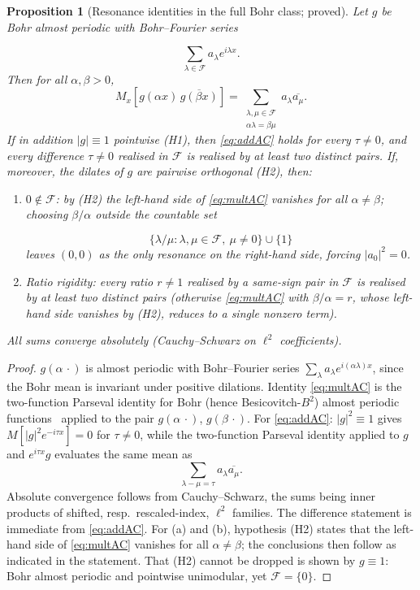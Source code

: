 \documentclass[11pt]{article}
\newtheorem{proposition}[theorem]{Proposition}
\begin{document}
\begin{proposition}[Resonance identities in the full Bohr class; proved]
\label{prop:resonance}
Let $g$ be Bohr almost periodic with Bohr--Fourier series

\[
\sum_{\lambda\in\mathcal{F}} a_\lambda e^{i\lambda x}.
\]
 Then for all
$\alpha,\beta>0$,
\begin{equation}\label{eq:multAC}
M_x\!\left[g(\alpha x)\,\overline{g(\beta x)}\right]
= \sum_{\substack{\lambda,\mu\in\mathcal{F}\\ \alpha\lambda=\beta\mu}}
a_\lambda\overline{a_\mu}.
\end{equation}
If in addition $|g|\equiv 1$ pointwise (H1), then \eqref{eq:addAC} holds
for every $\tau\neq 0$, and every difference $\tau\neq0$ realised in
$\mathcal{F}$ is realised by at least two distinct pairs. If, moreover, the
dilates of $g$ are pairwise orthogonal (H2), then:
\begin{enumerate}
\item[(a)] $0\notin\mathcal{F}$: by (H2) the left-hand side of
\eqref{eq:multAC} vanishes for all $\alpha\neq\beta$; choosing
$\beta/\alpha$ outside the countable set

\[
\{\lambda/\mu : \lambda,\mu\in\mathcal{F},\ \mu\neq0\}\cup\{1\}
\]
 leaves
$(0,0)$ as the only resonance on the right-hand side, forcing $|a_0|^2=0$.
\item[(b)] Ratio rigidity: every ratio $r\neq1$ realised by a same-sign
pair in $\mathcal{F}$ is realised by at least two distinct pairs (otherwise
\eqref{eq:multAC} with $\beta/\alpha=r$, whose left-hand side vanishes by
(H2), reduces to a single nonzero term).
\end{enumerate}
All sums converge absolutely (Cauchy--Schwarz on $\ell^2$ coefficients).
\end{proposition}

\begin{proof}
$g(\alpha\,\cdot)$ is almost periodic with Bohr--Fourier series
$\sum_\lambda a_\lambda e^{i(\alpha\lambda)x}$, since the Bohr mean is
invariant under positive dilations. Identity \eqref{eq:multAC} is the
two-function Parseval identity for Bohr (hence Besicovitch-$B^2$) almost
periodic functions~\cite{Besicovitch32,Corduneanu68} applied to the pair
$g(\alpha\,\cdot)$, $g(\beta\,\cdot)$. For \eqref{eq:addAC}: $|g|^2\equiv 1$
gives $M[|g|^2 e^{-i\tau x}] = 0$ for $\tau\neq0$, while the two-function
Parseval identity applied to $g$ and $e^{i\tau x}g$ evaluates the same
mean as 
\[
\sum_{\lambda-\mu=\tau} a_\lambda\overline{a_\mu}.
\]
 Absolute
convergence follows from Cauchy--Schwarz, the sums being inner products
of shifted, resp.\ rescaled-index, $\ell^2$ families. The difference
statement is immediate from \eqref{eq:addAC}. For (a) and (b),
hypothesis (H2) states that the left-hand side of \eqref{eq:multAC}
vanishes for all $\alpha\neq\beta$; the conclusions then follow as
indicated in the statement. That (H2) cannot be dropped is shown by
$g\equiv 1$: Bohr almost periodic and pointwise unimodular, yet
$\mathcal{F}=\{0\}$.
\end{proof}
\end{document}

